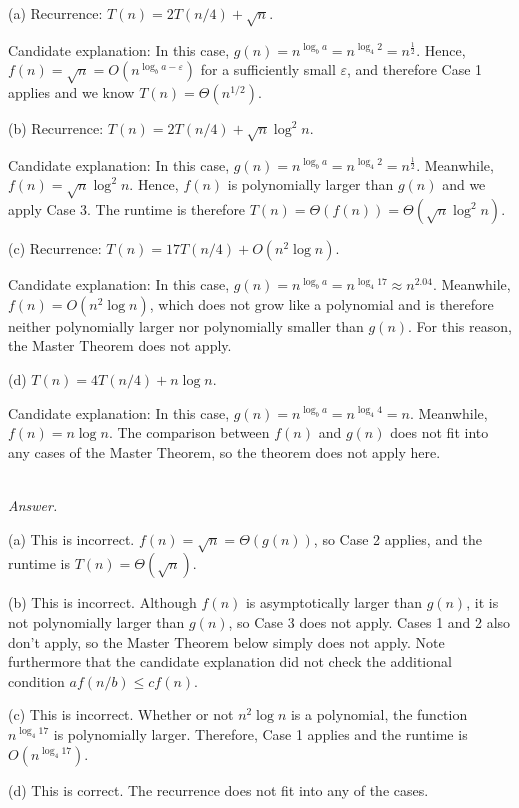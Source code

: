 \documentclass[12pt]{article}  %
\begin{document}
(a) Recurrence: $T(n) = 2T(n/4)+ \sqrt{n}$.

Candidate explanation: In this case, $g(n) = n^{\log_b a} = n^{\log_4 2} = n^{\frac{1}{2}}$. Hence, $f(n) = \sqrt{n} = O(n^{\log_b a - \varepsilon})$ for a sufficiently small $\varepsilon$, and therefore Case 1 applies and we know $T(n) = \Theta(n^{1/2})$. 

(b) Recurrence: $T(n) = 2T(n/4)+ \sqrt{n} \log^2 n$.

Candidate explanation: In this case, $g(n) = n^{\log_b a} = n^{\log_4 2} = n^{\frac{1}{2}}$. Meanwhile, $f(n) = \sqrt{n} \log^2 n$. Hence, $f(n)$ is polynomially larger than $g(n)$ and we apply Case 3. The runtime is therefore $T(n) = \Theta(f(n)) = \Theta(\sqrt{n} \log^2 n)$.

(c) Recurrence: $T(n) = 17T(n/4)+ O(n^2 \log n)$.

Candidate explanation: In this case, $g(n) = n^{\log_b a} = n^{\log_4 17} \approx  n^{2.04}$. Meanwhile, $f(n) = O(n^2 \log n)$, which does not grow like a polynomial and is therefore neither polynomially larger nor polynomially smaller than $g(n)$. For this reason, the Master Theorem does not apply.

(d)  $T(n) = 4T(n/4)+ n \log n$.

Candidate explanation: In this case, $g(n) = n^{\log_b a} = n^{\log_4 4} = n$. Meanwhile, $f(n) = n \log n$. The comparison between $f(n)$ and $g(n)$ does not fit into any cases of the Master Theorem, so the theorem does not apply here.


~\\

\textit{Answer.}

(a) This is incorrect. $f(n) = \sqrt{n} = \Theta(g(n))$, so Case 2 applies, and the runtime is $T(n) = \Theta(\sqrt{n})$.


(b) This is incorrect. Although $f(n)$ is asymptotically larger than $g(n)$, it is not polynomially larger than $g(n)$, so Case 3 does not apply. Cases 1 and 2 also don't apply, so the Master Theorem below simply does not apply. Note furthermore that the candidate explanation did not check the additional condition $a f(n/b) \leq c f(n)$. 

(c) This is incorrect. Whether or not $n^2 \log n$ is a polynomial, the function $n^{\log_4 17}$ is polynomially larger. Therefore, Case 1 applies and the runtime is $O(n^{\log_4 17})$.
	
(d) This is correct. The recurrence does not fit into any of the cases.
\end{document}
